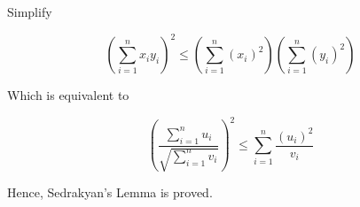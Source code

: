 \documentclass{article}
\begin{document}
\begin{enumerate}
	      Simplify

	      \begin{equation}
		      \left(\sum_{i=1}^{n}x_i y_i\right)^2 \leq \left(\sum_{i=1}^{n}(x_i)^2\right) \left(\sum_{i=1}^{n}(y_i)^2\right)
	      \end{equation}

	      Which is equivalent to

	      \begin{equation}
		      \left(\frac{\sum_{i=1}^{n}u_i}{\sqrt{\sum_{i=1}^{n}v_i}}\right)^2 \leq \sum_{i=1}^{n}\frac{(u_i)^2}{v_i}
	      \end{equation}

	      Hence, Sedrakyan's Lemma is proved.
\end{enumerate}
\end{document}
